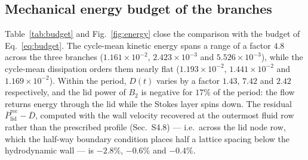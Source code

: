 \documentclass[11pt,a4paper]{article}
\newcommand{\Dbar}{\overline{D}}
\begin{document}
\subsection{Mechanical energy budget of the branches}
\label{sec:budget}

Table~\ref{tab:budget} and Fig.~\ref{fig:energy} close the comparison with the
budget of Eq.~\eqref{eq:budget}. The cycle-mean kinetic energy spans a range of a
factor $4.8$ across the three branches ($1.161\times10^{-2}$,
$2.423\times10^{-3}$ and $5.526\times10^{-3}$), while the cycle-mean dissipation
orders them nearly flat ($1.193\times10^{-2}$, $1.441\times10^{-2}$ and
$1.169\times10^{-2}$). Within the period, $D(t)$ varies by a factor $1.43$, $7.42$
and $2.42$ respectively, and the lid power of $B_2$ is negative for $17\%$ of the
period: the flow returns energy through the lid while the Stokes layer spins down.
The residual $\overline{P}_{\mathrm{lid}}^{\mathrm{rec}}-\Dbar$, computed with the
wall velocity recovered at the outermost fluid row rather than the prescribed profile
(Sec.~S4.8) --- i.e.\ across the lid node row, which the half-way boundary
condition places half a lattice spacing below the hydrodynamic wall --- is
$-2.8\%$, $-0.6\%$ and $-0.4\%$.
\end{document}
